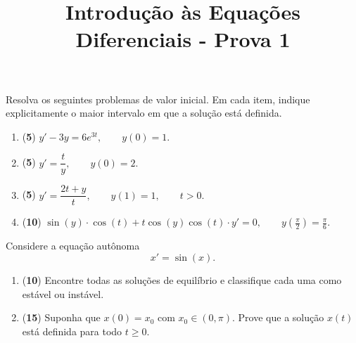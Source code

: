 \documentclass[10pt,a4paper]{amsart}
\title{Introdução às Equações Diferenciais - Prova 1}
\begin{document}
\maketitle


\vspace{5mm}

 Resolva os seguintes problemas de valor inicial. Em cada item, indique explicitamente o maior intervalo em que a solução está definida.
\begin{enumerate}[label=(\alph*)]
    \item ({\bf 5}) $y' - 3y = 6e^{3t}, \qquad y(0) = 1.$
    \item ({\bf 5}) $y' = \dfrac{t}{y}, \qquad y(0) = 2.$
    \item ({\bf 5}) $y' = \dfrac{2t + y}{t}, \qquad y(1) = 1, \qquad t > 0.$ 
    \item ({\bf 10}) 
$\sin (y )\cdot \cos (t) + t \cos (y) \cos (t)\cdot y' = 0, \qquad y\left(\tfrac{\pi}{2}\right) = \tfrac{\pi}{6}.$
\end{enumerate}

\vspace{5mm}

 Considere a equação autônoma
\[
    x' = \sin(x).
\]
\begin{enumerate}[label=(\alph*)]
    \item ({\bf 10}) Encontre todas as soluções de equilíbrio e classifique cada uma como estável ou instável.
    \item ({\bf 15}) Suponha que $x(0) = x_0$ com $x_0 \in (0, \pi)$. Prove que a solução $x(t)$ está definida para todo $t \geq 0$.
\end{enumerate}

\vspace{5mm}
\end{document}
